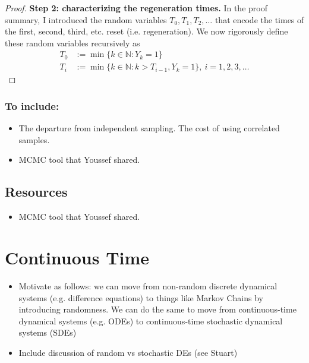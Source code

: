 \documentclass[12pt]{article}
\begin{document}
\begin{proof}
\bigskip
\noindent
\textbf{Step 2: characterizing the regeneration times.} In the proof summary, I introduced the random variables $T_0, T_1, T_2, \dots$ that encode the times of the first, second, third, etc. 
reset (i.e. regeneration). We now rigorously define these random variables recursively as 
\begin{align*}
T_0 &:= \min\{k \in \mathbb{N}: Y_k = 1\} \\
 T_i &:= \min\{k \in \mathbb{N}: k > T_{i - 1}, Y_k = 1\}, \ i = 1, 2, 3, \dots
\end{align*}


\end{proof} 




\subsubsection{To include:}
\begin{itemize}
\item The departure from independent sampling. The cost of using correlated samples. 
\item MCMC tool that Youssef shared. 
\end{itemize}

\subsection{Resources}
\begin{itemize}
\item MCMC tool that Youssef shared. 
\end{itemize}









\section{Continuous Time}
\begin{itemize}
\item Motivate as follows: we can move from non-random discrete dynamical systems (e.g. difference equations) to things like Markov Chains by introducing randomness. We can do the 
same to move from continuous-time dynamical systems (e.g. ODEs) to continuous-time stochastic dynamical systems (SDEs) 
\item Include discussion of random vs stochastic DEs (see Stuart)
\end{itemize}
\end{document}
